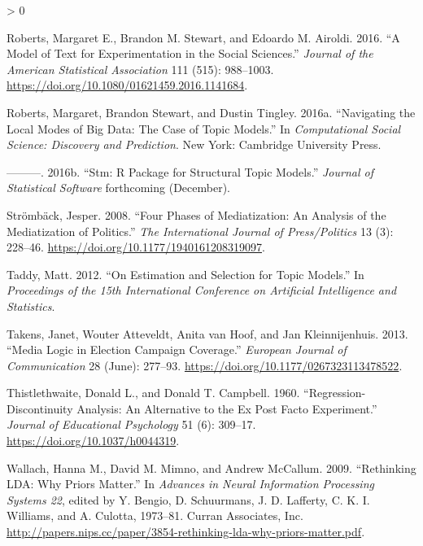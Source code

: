 \documentclass[
]{article}
\newlength{\cslhangindent}
\newenvironment{CSLReferences}[2] %
 {%
  \setlength{\parindent}{0pt}
  \ifodd #1 \everypar{\setlength{\hangindent}{\cslhangindent}}\ignorespaces\fi
  \ifnum #2 > 0
  \setlength{\parskip}{#2\baselineskip}
  \fi
 }%
 {}
\begin{document}
\begin{CSLReferences}{1}{0}
\leavevmode\hypertarget{ref-roberts_model_2016}{}%
Roberts, Margaret E., Brandon M. Stewart, and Edoardo M. Airoldi. 2016.
{``A Model of Text for Experimentation in the Social Sciences.''}
\emph{Journal of the American Statistical Association} 111 (515):
988--1003. \url{https://doi.org/10.1080/01621459.2016.1141684}.

\leavevmode\hypertarget{ref-roberts_navigating_2016}{}%
Roberts, Margaret, Brandon Stewart, and Dustin Tingley. 2016a.
{``Navigating the Local Modes of Big Data: The Case of Topic Models.''}
In \emph{Computational Social Science: Discovery and Prediction}. New
York: Cambridge University Press.

\leavevmode\hypertarget{ref-roberts_stm:_2016}{}%
---------. 2016b. {``Stm: R Package for Structural Topic Models.''}
\emph{Journal of Statistical Software} forthcoming (December).

\leavevmode\hypertarget{ref-stromback_four_2008}{}%
Strömbäck, Jesper. 2008. {``Four Phases of Mediatization: An Analysis of
the Mediatization of Politics.''} \emph{The International Journal of
Press/Politics} 13 (3): 228--46.
\url{https://doi.org/10.1177/1940161208319097}.

\leavevmode\hypertarget{ref-taddy_estimation_2012}{}%
Taddy, Matt. 2012. {``On Estimation and Selection for Topic Models.''}
In \emph{Proceedings of the 15th International Conference on Artificial
Intelligence and Statistics}.

\leavevmode\hypertarget{ref-takens_media_2013}{}%
Takens, Janet, Wouter Atteveldt, Anita van Hoof, and Jan Kleinnijenhuis.
2013. {``Media Logic in Election Campaign Coverage.''} \emph{European
Journal of Communication} 28 (June): 277--93.
\url{https://doi.org/10.1177/0267323113478522}.

\leavevmode\hypertarget{ref-thistlethwaite_regression-discontinuity_1960}{}%
Thistlethwaite, Donald L., and Donald T. Campbell. 1960.
{``Regression-Discontinuity Analysis: An Alternative to the Ex Post
Facto Experiment.''} \emph{Journal of Educational Psychology} 51 (6):
309--17. \url{https://doi.org/10.1037/h0044319}.

\leavevmode\hypertarget{ref-wallach_rethinking_2009}{}%
Wallach, Hanna M., David M. Mimno, and Andrew McCallum. 2009.
{``Rethinking {LDA}: Why Priors Matter.''} In \emph{Advances in Neural
Information Processing Systems 22}, edited by Y. Bengio, D. Schuurmans,
J. D. Lafferty, C. K. I. Williams, and A. Culotta, 1973--81. Curran
Associates, Inc.
\url{http://papers.nips.cc/paper/3854-rethinking-lda-why-priors-matter.pdf}.

\end{CSLReferences}
\end{document}

